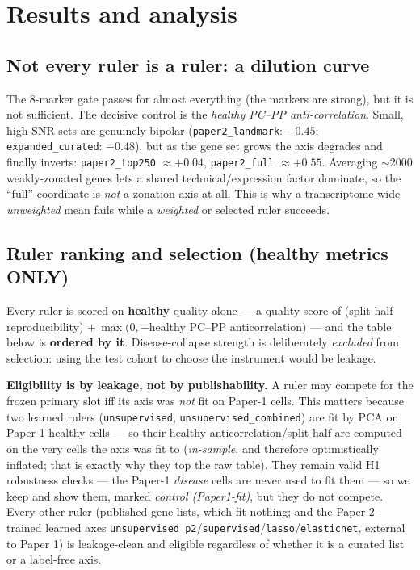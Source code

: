 \documentclass[11pt]{article}
\begin{document}
\section{Results and analysis}

\subsection{Not every ruler is a ruler: a dilution curve}
The 8-marker gate passes for almost everything (the markers are strong), but it is not sufficient.
The decisive control is the \emph{healthy PC--PP anti-correlation}. Small, high-SNR sets are
genuinely bipolar (\texttt{paper2\_landmark}: $-0.45$; \texttt{expanded\_curated}: $-0.48$), but as the gene set grows the axis
degrades and finally inverts: \texttt{paper2\_top250} $\approx +0.04$, \texttt{paper2\_full} $\approx +0.55$. Averaging
$\sim$2000 weakly-zonated genes lets a shared technical/expression factor dominate, so the
``full'' coordinate is \emph{not} a zonation axis at all. This is why a transcriptome-wide
\emph{unweighted} mean fails while a \emph{weighted} or selected ruler succeeds.

\subsection{Ruler ranking and selection (healthy metrics ONLY)}
Every ruler is scored on \textbf{healthy} quality alone --- a quality score of
(split-half reproducibility) $+\,\max(0,-$healthy PC--PP anticorrelation$)$ --- and the table below
is \textbf{ordered by it}. Disease-collapse strength is deliberately \emph{excluded} from selection:
using the test cohort to choose the instrument would be leakage.

\textbf{Eligibility is by leakage, not by publishability.} A ruler may compete for the frozen
primary slot iff its axis was \emph{not} fit on Paper-1 cells. This matters because two learned
rulers (\texttt{unsupervised}, \texttt{unsupervised\_combined}) are fit by PCA on Paper-1 healthy
cells --- so their healthy anticorrelation/split-half are computed on the very cells the axis was
fit to (\emph{in-sample}, and therefore optimistically inflated; that is exactly why they top the
raw table). They remain valid H1 robustness checks --- the Paper-1 \emph{disease} cells are never
used to fit them --- so we keep and show them, marked \emph{control (Paper1-fit)}, but they do not
compete. Every other ruler (published gene lists, which fit nothing; and the Paper-2-trained learned
axes \texttt{unsupervised\_p2}/\texttt{supervised}/\texttt{lasso}/\texttt{elasticnet}, external to
Paper 1) is leakage-clean and eligible regardless of whether it is a curated list or a label-free
axis.
\end{document}
